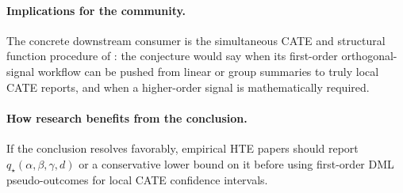 \documentclass[11pt]{article}
\theoremstyle{definition}
\theoremstyle{plain}
\theoremstyle{remark}
\begin{document}
\paragraph{Implications for the community.}
The concrete downstream consumer is the simultaneous CATE and structural
function procedure of \citet{SemenovaChernozhukov2021DMLCATE}: the conjecture
would say when its first-order orthogonal-signal workflow can be pushed from
linear or group summaries to truly local CATE reports, and when a
higher-order signal is mathematically required.

\paragraph{How research benefits from the conclusion.}
If the conclusion resolves favorably, empirical HTE papers should report
\(q_\star(\alpha,\beta,\gamma,d)\) or a conservative lower bound on it before
using first-order DML pseudo-outcomes for local CATE confidence intervals.
\end{document}
